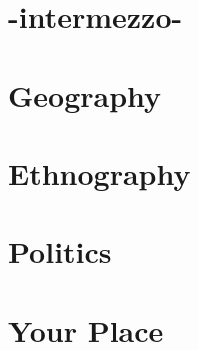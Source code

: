 \chapter*{-intermezzo-}
\chapter{Geography}

\chapter{Ethnography}
\chapter{Politics}
\chapter{Your Place}
